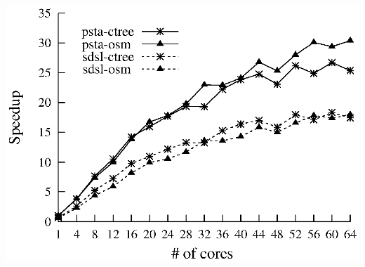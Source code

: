 {\begin{minipage}{\textwidth}
\begin{minipage}[b]{0.51\textwidth}
      \includegraphics[scale=0.5]{./images/speedup}
      \label{fig:speedup}
    \end{minipage}
  \end{minipage}
      }
%
